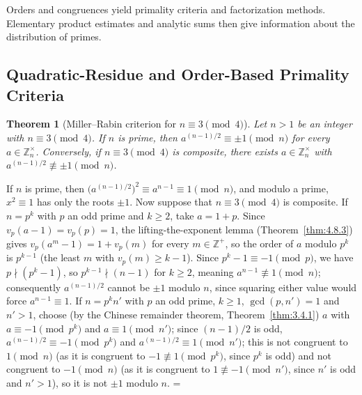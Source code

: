 \documentclass[11pt]{article}
\makeatletter
\let\nt@closedisplay\]
\def\nt@guardedclose{\@ifnextchar\par{\nt@closeafterpar}{\@ifnextchar\end{\postdisplaypenalty\@M\nt@closedisplay}{\nt@closedisplay}}}
\def\nt@closeafterpar\par{\@ifnextchar\par{\nt@closeafterpar}{\@ifnextchar\end{\postdisplaypenalty\@M\nt@closedisplay\par}{\nt@closedisplay\par}}}
\renewenvironment{proof}[1][\proofname]{\par
  \pushQED{\qed}\normalfont\topsep\medskipamount\edef\nt@afterproof{\@endparpenalty=\the\@endparpenalty\relax}\@beginparpenalty\@M\@endparpenalty\@M\let\]\nt@guardedclose\trivlist\item[]\textit{#1\@addpunct{.}} \ignorespaces}{\ifvmode\addpenalty\@M\fi\popQED\nt@afterproof\endtrivlist\@endpefalse}
\theoremstyle{ntstyle}
\newtheorem{theorem}{Theorem}[subsection]
\newcommand{\ZmodUnits}[1]{\mathbb{Z}_{#1}^{\times}}
\makeatother
\begin{document}
Orders and congruences yield primality criteria and factorization methods. Elementary product estimates and
analytic sums then give information about the distribution of primes.


\subsection{Quadratic-Residue and Order-Based Primality Criteria}

\begin{theorem}[Miller--Rabin criterion for $n\equiv3\pmod{4}$]\label{thm:9.1.1}\label{thm:miller-rabin-criterion-for-n34}
  Let $n>1$ be an integer with $n\equiv3\pmod{4}$. If $n$ is prime,
  then $a^{(n-1)/2}\equiv\pm1\pmod{n}$ for every
  $a\in\ZmodUnits{n}$. Conversely, if $n\equiv3\pmod{4}$ is
  composite, there exists $a\in\ZmodUnits{n}$ with
  $a^{(n-1)/2}\not\equiv\pm1\pmod{n}$.

\end{theorem}

\begin{proof} If $n$ is prime, then
  $\big(a^{(n-1)/2}\big)^{2}\equiv a^{n-1}\equiv1\pmod{n}$, and modulo a
  prime, $x^{2}\equiv1$ has only the roots $\pm1$. Now suppose that $n\equiv3\pmod{4}$ is
  composite. If $n=p^{k}$ with $p$ an odd prime and $k\ge2$, take $a=1+p$. Since
  $v_p(a-1)=v_p(p)=1$, the lifting-the-exponent lemma (Theorem~\ref{thm:4.8.3}) gives
  $v_p(a^{m}-1)=1+v_p(m)$ for every $m\in\mathbb{Z}^+$, so the order
  of $a$ modulo $p^{k}$ is $p^{k-1}$ (the least $m$ with $v_p(m)\ge k-1$). Since $p^{k}-1\equiv-1\pmod{p}$, we have
  $p\nmid(p^{k}-1)$, so
  $p^{k-1}\nmid(n-1)$ for $k\ge2$, meaning
  $a^{n-1}\not\equiv1\pmod{n}$; consequently $a^{(n-1)/2}$ cannot
  be $\pm1$ modulo $n$, since squaring either value would force
  $a^{n-1}\equiv1$. If $n=p^{k}n'$ with $p$ an odd prime, $k\ge1$, $\gcd(p, n')=1$ and $n'>1$, choose
  (by the Chinese remainder theorem, Theorem~\ref{thm:3.4.1})
  $a$ with $a\equiv-1\pmod{p^{k}}$ and $a\equiv1\pmod{n'}$; since
  $(n-1)/2$ is odd, $a^{(n-1)/2}\equiv-1\pmod{p^{k}}$ and
  $a^{(n-1)/2}\equiv1\pmod{n'}$; this is not congruent to $1\pmod{n}$ (as it is
  congruent to $-1\not\equiv1\pmod{p^{k}}$, since $p^k$ is odd) and not
  congruent to $-1\pmod{n}$ (as it is congruent to $1\not\equiv-1\pmod{n'}$, since
  $n'$ is odd and $n'>1$), so it is not $\pm1$ modulo $n$.
\end{proof}
\end{document}
